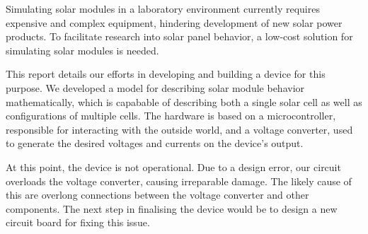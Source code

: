 

Simulating  solar  modules  in  a laboratory  environment  currently  requires
expensive  and complex  equipment, hindering  development of  new solar  power
products. To  facilitate  research  into  solar  panel  behavior,  a  low-cost
solution for simulating solar modules is needed.

This  report details  our  efforts in  developing and  building  a device  for
this  purpose. We  developed a  model  for  describing solar  module  behavior
mathematically, which is  capabable of describing both a single  solar cell as
well  as  configurations  of  multiple  cells. The  hardware  is  based  on  a
microcontroller, responsible  for interacting  with the  outside world,  and a
voltage converter, used  to generate the desired voltages and  currents on the
device's output.

At  this point,  the device  is not  operational. Due to  a design  error, our
circuit  overloads  the  voltage converter,  causing  irreparable  damage. The
likely cause  of this are  overlong connections between the  voltage converter
and other  components.  The  next step  in finalising the  device would  be to
design a new circuit board for fixing this issue.
